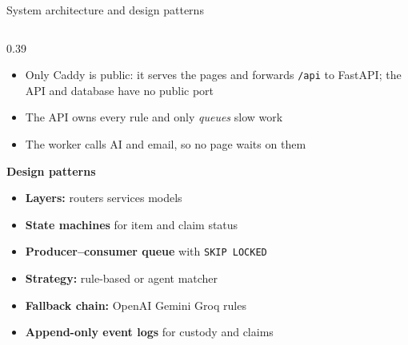 \documentclass[aspectratio=169,10pt]{beamer}
\newcommand{\head}[1]{{\footnotesize\bfseries\color{branddark}#1}\par\vspace{1pt}}
\begin{document}
\begin{frame}[t]{System architecture and design patterns}
\begin{columns}[T,onlytextwidth]
\begin{column}{0.39\textwidth}
\begin{itemize}
\item Only Caddy is public: it serves the pages and forwards \texttt{/api} to FastAPI; the API and database have no public port
\item The API owns every rule and only \emph{queues} slow work
\item The worker calls AI and email, so no page waits on them
\end{itemize}
\vspace{4pt}
\head{Design patterns}
\begin{itemize}\setlength{\itemsep}{0pt}\scriptsize
\item \textbf{Layers:} routers \textrightarrow{} services \textrightarrow{} models
\item \textbf{State machines} for item and claim status
\item \textbf{Producer--consumer queue} with \texttt{SKIP LOCKED}
\item \textbf{Strategy:} rule-based or agent matcher
\item \textbf{Fallback chain:} OpenAI \textrightarrow{} Gemini \textrightarrow{} Groq \textrightarrow{} rules
\item \textbf{Append-only event logs} for custody and claims
\end{itemize}
\end{column}
\end{columns}
\end{frame}
\end{document}
